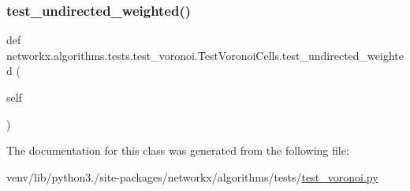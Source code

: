 \subsubsection{\texorpdfstring{test\+\_\+undirected\+\_\+weighted()}{test\_undirected\_weighted()}}
{\footnotesize\ttfamily def networkx.\+algorithms.\+tests.\+test\+\_\+voronoi.\+Test\+Voronoi\+Cells.\+test\+\_\+undirected\+\_\+weighted (\begin{DoxyParamCaption}\item[{}]{self }\end{DoxyParamCaption})}



The documentation for this class was generated from the following file\+:\begin{DoxyCompactItemize}
\item 
venv/lib/python3./site-\/packages/networkx/algorithms/tests/\hyperlink{test__voronoi_8py}{test\+\_\+voronoi.\+py}\end{DoxyCompactItemize}

